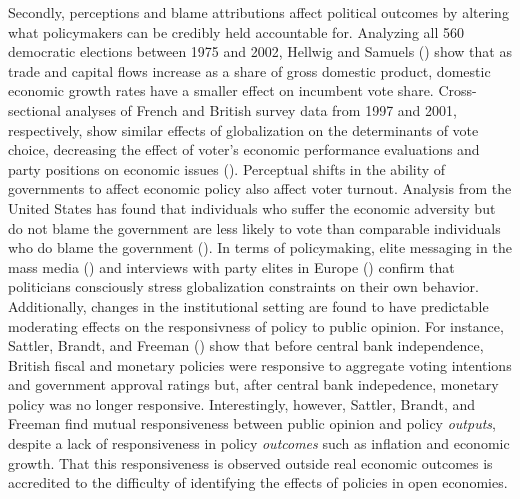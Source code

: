 \documentclass[12pt]{report}
\begin{document}
Secondly, perceptions and blame attributions affect political outcomes by altering what policymakers
can be credibly held accountable for. Analyzing all 560 democratic elections between 1975 and 2002,
Hellwig and Samuels (\citeyear{Hellwig:2007gn}) show that as trade and capital flows increase as a
share of gross domestic product, domestic economic growth rates have a smaller effect on incumbent
vote share. Cross-sectional analyses of French and British survey data from 1997 and 2001,
respectively, show similar effects of globalization on the determinants of vote choice, decreasing
the effect of voter's economic performance evaluations and party positions on economic issues
(\citealt{Hellwig:2008ia}). Perceptual shifts in the ability of governments to affect economic
policy also affect voter turnout. Analysis from the United States has found that individuals who
suffer the economic adversity but do not blame the government are less likely to vote than
comparable individuals who do blame the government (\citealt{Arcenaux:2003ue}). In terms of
policymaking, elite messaging in the mass media (\citealt{Hellwig:2011iu}) and interviews with party
elites in Europe (\citealt[206]{Hellwig:2012vk}) confirm that politicians consciously stress
globalization constraints on their own behavior. Additionally, changes in the institutional setting
are found to have predictable moderating effects on the responsivness of policy to public opinion.
For instance, Sattler, Brandt, and Freeman (\citeyear{:2010fv}) show that before central bank
independence, British fiscal and monetary policies were responsive to aggregate voting intentions
and government approval ratings but, after central bank indepedence, monetary policy was no longer
responsive. Interestingly, however, Sattler, Brandt, and Freeman \citeyearpar{Sattler:2008vw} find
mutual responsiveness between public opinion and policy \emph{outputs}, despite a lack of
responsiveness in policy \emph{outcomes} such as inflation and economic growth. That this
responsiveness is observed outside real economic outcomes is accredited to the difficulty of
identifying the effects of policies in open economies.
\end{document}
